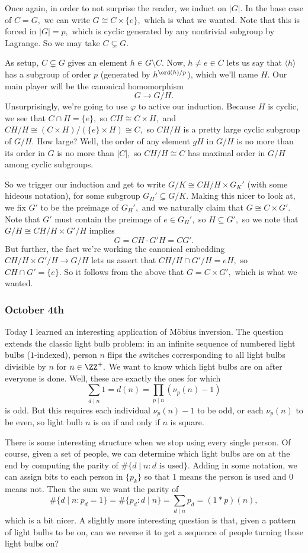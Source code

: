 Once again, in order to not surprise the reader, we induct on $|G|.$ In the base case of $C=G,$ we can write $G\cong C\times\{e\},$ which is what we wanted. Note that this is forced in $|G|=p,$ which is cyclic generated by any nontrivial subgroup by Lagrange. So we may take $C\subsetneq G.$

As setup, $C\subsetneq G$ gives an element $h\in G\setminus C.$ Now, $h\ne e\in C$ lets us say that $\langle h\rangle$ has a subgroup of order $p$ (generated by $h^{\ord(h)/p}$), which we'll name $H.$ Our main player will be the canonical homomorphism
\[G\to G/H.\]
Unsurprisingly, we're going to use $\varphi$ to active our induction. Because $H$ is cyclic, we see that $C\cap H=\{e\},$ so $CH\cong C\times H,$ and $CH/H\cong(C\times H)/(\{e\}\times H)\cong C,$ so $CH/H$ is a pretty large cyclic subgroup of $G/H.$ How large? Well, the order of any element $gH$ in $G/H$ is no more than its order in $G$ is no more than $|C|,$ so $CH/H\cong C$ has maximal order in $G/H$ among cyclic subgroups.

So we trigger our induction and get to write $G/K\cong CH/H\times G_K'$ (with some hideous notation), for some subgroup $G_H'\subseteq G/K.$ Making this nicer to look at, we fix $G'$ to be the preimage of $G_H',$ and we naturally claim that $G\cong C\times G'.$ Note that $G'$ must contain the preimage of $e\in G_H',$ so $H\subseteq G',$ so we note that $G/H\cong CH/H\times G'/H$ implies
\[G=CH\cdot G'H=CG'.\]
But further, the fact we're working the canonical embedding $CH/H\times G'/H\to G/H$ lets us assert that $CH/H\cap G'/H=eH,$ so $CH\cap G'=\{e\}.$ So it follows from the above that $G=C\times G',$ which is what we wanted.

\subsubsection{October 4th}
Today I learned an interesting application of M\"obius inversion. The question extends the classic light bulb problem: in an infinite sequence of numbered light bulbs ($1$-indexed), person $n$ flips the switches corresponding to all light bulbs divisible by $n$ for $n\in\ZZ^+.$ We want to know which light bulbs are on after everyone is done. Well, these are exactly the ones for which
\[\sum_{d\mid n}1=d(n)=\prod_{p\mid n}(\nu_p(n)-1)\]
is odd. But this requires each individual $\nu_p(n)-1$ to be odd, or each $\nu_p(n)$ to be even, so light bulb $n$ is on if and only if $n$ is square.

There is some interesting structure when we stop using every single person. Of course, given a set of people, we can determine which light bulbs are on at the end by computing the parity of $\#\{d\mid n:d\text{ is used}\}.$ Adding in some notation, we can assign bits to each person in $\{p_k\}$ so that $1$ means the person is used and $0$ means not. Then the sum we want the parity of
\[\#\{d\mid n:p_d=1\}=\#\{p_d:d\mid n\}=\sum_{d\mid n}p_d=(1*p)(n),\]
which is a bit nicer. A slightly more interesting question is that, given a pattern of light bulbs to be on, can we reverse it to get a sequence of people turning those light bulbs on?

